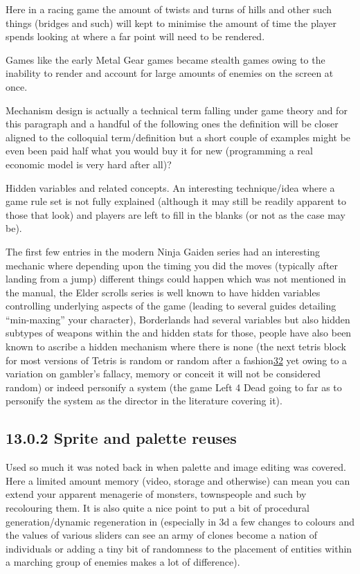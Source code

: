 \documentclass[
]{book}
\begin{document}
Here in a racing game the amount of twists and turns of hills and other such things (bridges and such) will kept to minimise the amount of time the player spends looking at where a far point will need to be rendered.

Games like the early Metal Gear games became stealth games owing to the inability to render and account for large amounts of enemies on the screen at once.

Mechanism design is actually a technical term falling under game theory and for this paragraph and a handful of the following ones the definition will be closer aligned to the colloquial term/definition but a short couple of examples might be even been paid half what you would buy it for new (programming a real economic model is very hard after all)?

Hidden variables and related concepts. An interesting technique/idea where a game rule set is not fully explained (although it may still be readily apparent to those that look) and players are left to fill in the blanks (or not as the case may be).

The first few entries in the modern Ninja Gaiden series had an interesting mechanic where depending upon the timing you did the moves (typically after landing from a jump) different things could happen which was not mentioned in the manual, the Elder scrolls series is well known to have hidden variables controlling underlying aspects of the game (leading to several guides detailing ``min-maxing'' your character), Borderlands had several variables but also hidden subtypes of weapons within the and hidden stats for those, people have also been known to ascribe a hidden mechanism where there is none (the next tetris block for most versions of Tetris is random or random after a fashion\href{romhacking202033.html\#fn32x0}{32} yet owing to a variation on gambler's fallacy, memory or conceit it will not be considered random) or indeed personify a system (the game Left 4 Dead going to far as to personify the system as the director in the literature covering it).

\hypertarget{sprite-and-palette-reuses}{%
\subsection{13.0.2 Sprite and palette reuses}\label{sprite-and-palette-reuses}}

Used so much it was noted back in when palette and image editing was covered. Here a limited amount memory (video, storage and otherwise) can mean you can extend your apparent menagerie of monsters, townspeople and such by recolouring them. It is also quite a nice point to put a bit of procedural generation/dynamic regeneration in (especially in 3d a few changes to colours and the values of various sliders can see an army of clones become a nation of individuals or adding a tiny bit of randomness to the placement of entities within a marching group of enemies makes a lot of difference).
\end{document}
